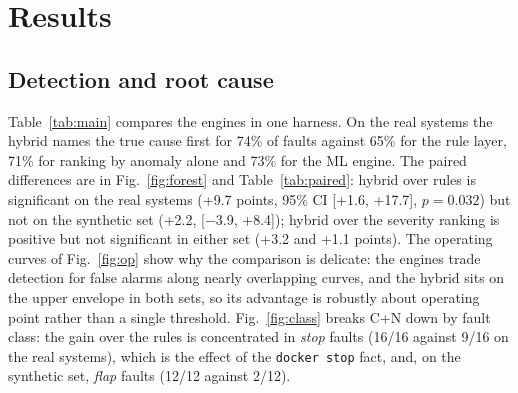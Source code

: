 \documentclass[journal]{IEEEtran}
\newcommand{\cn}{\textrm{C+N}}
\begin{document}
\section{Results}
\label{sec:results}

\subsection{Detection and root cause}
Table~\ref{tab:main} compares the engines in one harness. On the real systems the hybrid names the true cause first for 74\% of
faults against 65\% for the rule layer, 71\% for ranking by anomaly alone and 73\% for the ML engine. The paired differences are in
Fig.~\ref{fig:forest} and Table~\ref{tab:paired}: hybrid over rules is significant on the real systems (+9.7 points, 95\% CI
[+1.6, +17.7], $p{=}0.032$) but not on the synthetic set (+2.2, [$-$3.9, +8.4]); hybrid over the severity ranking is positive but not
significant in either set (+3.2 and +1.1 points). The operating curves of Fig.~\ref{fig:op} show why the comparison is delicate: the
engines trade detection for false alarms along nearly overlapping curves, and the hybrid sits on the upper envelope in both sets, so its
advantage is robustly about operating point rather than a single threshold. Fig.~\ref{fig:class} breaks \cn{} down by fault class: the
gain over the rules is concentrated in \emph{stop} faults (16/16 against 9/16 on the real systems), which is the effect of the
\texttt{docker stop} fact, and, on the synthetic set, \emph{flap} faults (12/12 against 2/12).
\end{document}
